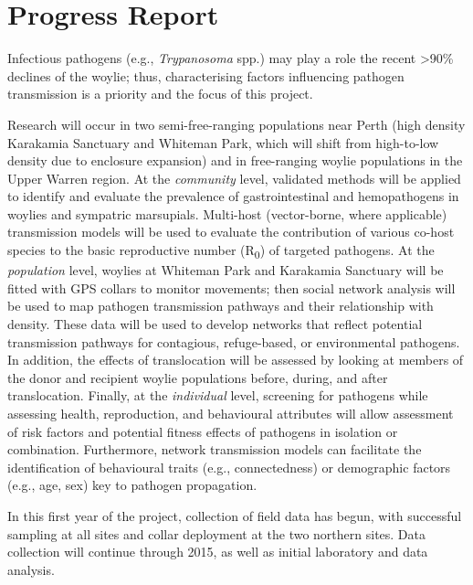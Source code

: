 \documentclass[version=last, paper=a4, DIV=18, usenames, dvipsnames]{scrartcl}
\begin{document}
%

%




\section*{Progress Report}
Infectious pathogens (e.g., \emph{Trypanosoma} spp.) may play a role the
recent \textgreater{}90\% declines of the woylie; thus, characterising
factors influencing pathogen transmission is a priority and the focus of
this project.

Research will occur in two semi-free-ranging populations near Perth
(high density Karakamia Sanctuary and Whiteman Park, which will shift
from high-to-low density due to enclosure expansion) and in free-ranging
woylie populations in the Upper Warren region. At the \emph{community}
level, validated methods will be applied to identify and evaluate the
prevalence of gastrointestinal and hemopathogens in woylies and
sympatric marsupials. Multi-host (vector-borne, where applicable)
transmission models will be used to evaluate the contribution of various
co-host species to the basic reproductive number (R\textsubscript{0}) of
targeted pathogens. At the \emph{population} level, woylies at Whiteman
Park and Karakamia Sanctuary will be fitted with GPS collars to monitor
movements; then social network analysis will be used to map pathogen
transmission pathways and their relationship with density. These data
will be used to develop networks that reflect potential transmission
pathways for contagious, refuge-based, or environmental pathogens. In
addition, the effects of translocation will be assessed by looking at
members of the donor and recipient woylie populations before, during,
and after translocation. Finally, at the \emph{individual} level,
screening for pathogens while assessing health, reproduction, and
behavioural attributes will allow assessment of risk factors and
potential fitness effects of pathogens in isolation or combination.
Furthermore, network transmission models can facilitate the
identification of behavioural traits (e.g., connectedness) or
demographic factors (e.g., age, sex) key to pathogen propagation.

In this first year of the project, collection of field data has begun,
with successful sampling at all sites and collar deployment at the two
northern sites. Data collection will continue through 2015, as well as
initial laboratory and data analysis.




\clearpage
\end{document}
